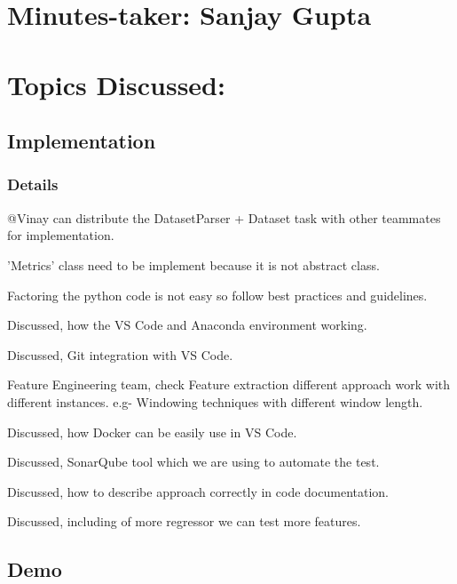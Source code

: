 \documentclass[11pt]{meetingmins} %
\begin{document}
\maketitle

\section{Minutes-taker: Sanjay Gupta}

\section{Topics Discussed:}

\subsection{Implementation}
\subsubsection{Details}
\begin{hiddensubitems}
	\item @Vinay can distribute the DatasetParser + Dataset task with other teammates for implementation.
	\item 'Metrics' class need to be implement because it is not abstract class.
	\item Factoring the python code is not easy so follow best practices and guidelines.
	\item Discussed, how the VS Code and Anaconda environment working.
	\item Discussed, Git integration with VS Code.
	\item Feature Engineering team, check Feature extraction different approach work with different instances. e.g- Windowing techniques with different window length.
	\item Discussed, how Docker can be easily use in VS Code.
	\item Discussed, SonarQube tool which we are using to automate the test.
	\item Discussed, how to describe approach correctly in code documentation.
    \item Discussed, including of more regressor we can test more features.	  
\end{hiddensubitems}

\subsection{Demo}
\end{document}

